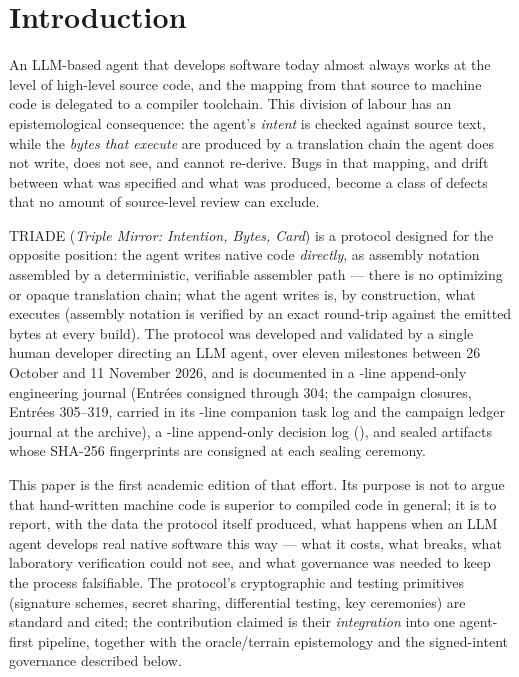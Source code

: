 \documentclass[11pt,a4paper]{article}
\begin{document}
\section{Introduction}\label{sec:intro}

An LLM-based agent that develops software today almost always works at the
level of high-level source code, and the mapping from that source to
machine code is delegated to a compiler toolchain. This division of labour
has an epistemological consequence: the agent's \emph{intent} is checked
against source text, while the \emph{bytes that execute} are produced by a
translation chain the agent does not write, does not see, and cannot
re-derive. Bugs in that mapping, and drift between what was specified and
what was produced, become a class of defects that no amount of source-level
review can exclude.

TRIADE (\emph{Triple Mirror: Intention, Bytes, Card}) is a protocol
designed for the opposite position: the agent writes native code
\emph{directly}, as assembly notation assembled by a deterministic,
verifiable assembler path --- there is no optimizing or opaque translation
chain; what the agent writes is, by construction, what executes
(assembly notation is verified by an exact round-trip against the emitted
bytes at every build). The protocol was developed and validated by a
single human developer directing an LLM agent, over eleven milestones
between 26 October and 11 November 2026, and is documented in a
\nbLignesJournal-line append-only engineering journal (Entr\'ees
consigned through 304; the campaign closures, Entr\'ees 305--319,
carried in its \nbLignesWorklog-line companion task log and the campaign
ledger journal at the archive), a \nbLignesDecisions-line append-only
decision log (\plageDecisions), and sealed artifacts whose
SHA-256 fingerprints are consigned at each sealing ceremony.

This paper is the first academic edition of that effort. Its purpose is
not to argue that hand-written machine code is superior to compiled code
in general; it is to report, with the data the protocol itself produced,
what happens when an LLM agent develops real native software this way ---
what it costs, what breaks, what laboratory verification could not see,
and what governance was needed to keep the process falsifiable. The
protocol's cryptographic and testing primitives (signature schemes,
secret sharing, differential testing, key ceremonies) are standard and
cited; the contribution claimed is their \emph{integration} into one
agent-first pipeline, together with the oracle/terrain epistemology and
the signed-intent governance described below.
\end{document}
